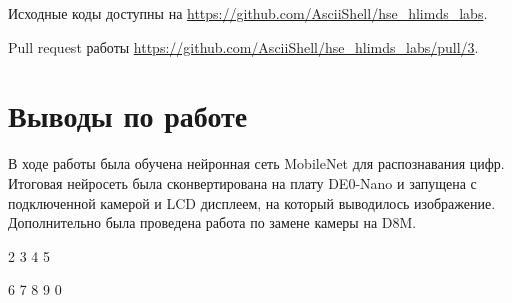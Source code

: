 \documentclass[a4paper,14pt]{article}
\begin{document}
    Исходные коды доступны на \href{https://github.com/AsciiShell/hse_hlimds_labs}
    {https://github.com/AsciiShell/hse\_hlimds\_labs}.

    Pull request работы \href{https://github.com/AsciiShell/hse_hlimds_labs/pull/3}
    {https://github.com/AsciiShell/hse\_hlimds\_labs/pull/3}.


    \section{Выводы по работе}
    В ходе работы была обучена нейронная сеть MobileNet для распознавания цифр.
    Итоговая нейросеть была сконвертирована на плату DE0-Nano и запущена с подключенной камерой и LCD дисплеем, на который выводилось изображение.
    Дополнительно была проведена работа по замене камеры на D8M.

	\pagebreak
	\begin{landscape}
	\begin{spacing}{15}
		{\fontsize{200}{220} \hfill 2 \hfill 3 \hfill 4 \hfill 5 
			
		 6 \hfill 7 \hfill 8 \hfill 9 \hfill 0}
	\end{spacing}
	\end{landscape}
\end{document}
